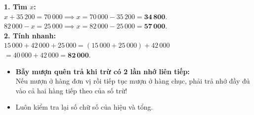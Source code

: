 \documentclass[11pt,a4paper]{article}
\begin{document}
\vspace{-2.5mm}
\noindent
\begin{minipage}[t]{0.49\textwidth}\vspace{0pt}
\begin{tcolorbox}[
  enhanced,
  colback=green!4!white,
  colframe=green!60!black,
  arc=2mm, boxrule=0.8pt,
  left=2mm, right=2mm, top=1.8mm, bottom=1.8mm,
  title={\footnotesize\bfseries\color{white}\faCheckCircle\ Ví dụ thực hành chuẩn mực}
]
{\footnotesize
\textbf{1. Tìm $x$:}\\
$x + 35\,200 = 70\,000 \implies x = 70\,000 - 35\,200 = \mathbf{34\,800}$.\\
$82\,000 - x = 25\,000 \implies x = 82\,000 - 25\,000 = \mathbf{57\,000}$.\\
\textbf{2. Tính nhanh:}\\
$15\,000 + 42\,000 + 25\,000 = (15\,000 + 25\,000) + 42\,000$\\
$= 40\,000 + 42\,000 = \mathbf{82\,000}$.
}
\end{tcolorbox}
\end{minipage}
\hfill
\begin{minipage}[t]{0.49\textwidth}\vspace{0pt}
\begin{tcolorbox}[
  enhanced,
  colback=red!4!white,
  colframe=red!70!black,
  arc=2mm, boxrule=0.8pt,
  left=2mm, right=2mm, top=1.8mm, bottom=1.8mm,
  title={\footnotesize\bfseries\color{white}\faExclamationTriangle\ Mẹo tránh bẫy trắc nghiệm}
]
{\footnotesize
\begin{itemize}\setlength{\itemsep}{1.5pt}\setlength{\leftskip}{-2.5mm}
  \item \textbf{Bẫy mượn quên trả khi trừ có 2 lần nhớ liên tiếp:}\\
  Nếu mượn ở hàng đơn vị rồi tiếp tục mượn ở hàng chục, phải trả nhớ đầy đủ vào cả hai hàng tiếp theo của số trừ!
  \item Luôn kiểm tra lại số chữ số của hiệu và tổng.
\end{itemize}
}
\end{tcolorbox}
\end{minipage}
\end{document}
